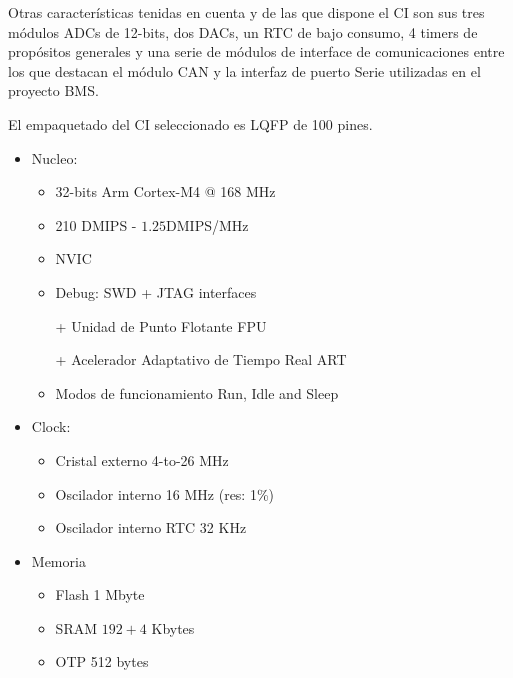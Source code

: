 \documentclass[10pt,a4paper]{article}
\begin{document}
\begin{itemize}
Otras características tenidas en cuenta y de las que dispone el \acrshort{CI}
son sus tres módulos ADCs de 12-bits, dos DACs, un \acrshort{RTC} de
bajo consumo, 4 timers de propósitos generales y una serie de módulos de
interface de comunicaciones entre los que destacan el módulo \acrshort{CAN} y la
interfaz de puerto Serie utilizadas en el proyecto \acrshort{BMS}.

El empaquetado del \acrshort{CI} seleccionado es \acrfull{LQFP} de 100 pines.

\begin{itemize}                                                                  
    \item Nucleo: 

        \begin{itemize}                                                                  
            \item  32-bits Arm Cortex-M4 @ 168 MHz     
            \item  210 \acrshort{DMIPS} - $1.25$\acrshort{DMIPS}/MHz
            \item \acrfull{NVIC}
            \item Debug: \acrfull{SWD} + JTAG interfaces
            \item [+] Unidad de Punto Flotante \acrshort{FPU} 
            \item [+] Acelerador Adaptativo de Tiempo Real \acrshort{ART} 
            \item Modos de funcionamiento Run, Idle and Sleep                          
        \end{itemize}

    \item Clock:

        \begin{itemize}
            \item Cristal externo 4-to-26 MHz 
            \item Oscilador interno 16 MHz (res: 1\%)
            \item Oscilador interno RTC 32 KHz 
        \end{itemize}

    \item Memoria                                       

        \begin{itemize}                                                                  
            \item Flash 1 Mbyte 
            \item \acrshort{SRAM} $192+4$ Kbytes  
            \item \acrshort{OTP} 512 bytes 
        \end{itemize}


\end{itemize}
\end{itemize}
\end{document}
